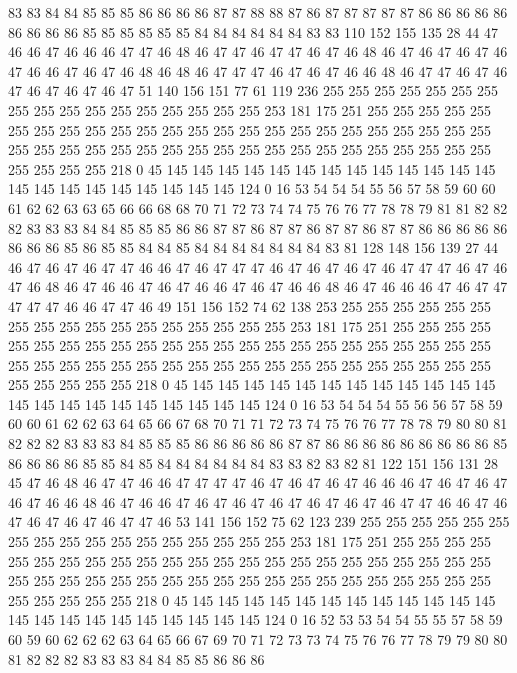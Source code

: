 83 83 84 84 85 85 85 86 86 86 86 87 87 88 88 87 86 87 87 87
87 87 86 86 86 86 86 86 86 86 86 85 85 85 85 85 85 84 84 84
84 84 84 83 83 110 152 155 135 28 44 47 46 46 47 46 46 46 47 47
46 48 46 47 47 46 47 47 46 47 46 48 46 47 46 47 46 47 46 47
46 46 47 46 47 46 48 46 48 46 47 47 47 46 47 46 47 46 46 48
46 47 47 46 47 46 47 46 47 46 47 46 47 51 140 156 151 77 61 119
236 255 255 255 255 255 255 255 255 255 255 255 255 255 255 255 255 255 253 181
175 251 255 255 255 255 255 255 255 255 255 255 255 255 255 255 255 255 255 255
255 255 255 255 255 255 255 255 255 255 255 255 255 255 255 255 255 255 255 255
255 255 255 255 255 255 255 255 255 218 0 45 145 145 145 145 145 145 145 145
145 145 145 145 145 145 145 145 145 145 145 145 145 145 124 0 16 53 54 54
54 55 56 57 58 59 60 60 61 62 62 63 63 65 66 66 68 68 70 71
72 73 74 74 75 76 76 77 78 78 79 81 81 82 82 82 83 83 83 84
84 85 85 85 86 86 87 87 86 87 87 86 87 87 86 87 87 86 86 86
86 86 86 86 86 85 86 85 85 84 84 85 84 84 84 84 84 84 84 83
81 128 148 156 139 27 44 46 47 46 47 46 47 47 46 46 47 46 47 47
47 46 47 46 47 46 47 46 47 47 47 46 47 46 47 46 48 46 47 46
46 47 46 47 46 46 47 46 47 46 46 48 46 47 46 46 46 47 46 47
47 47 47 47 46 46 47 47 46 49 151 156 152 74 62 138 253 255 255 255
255 255 255 255 255 255 255 255 255 255 255 255 255 255 253 181 175 251 255 255
255 255 255 255 255 255 255 255 255 255 255 255 255 255 255 255 255 255 255 255
255 255 255 255 255 255 255 255 255 255 255 255 255 255 255 255 255 255 255 255
255 255 255 255 255 218 0 45 145 145 145 145 145 145 145 145 145 145 145 145
145 145 145 145 145 145 145 145 145 145 124 0 16 53 54 54 54 55 56 56
57 58 59 60 60 61 62 62 63 64 65 66 67 68 70 71 71 72 73 74
75 76 76 77 78 78 79 80 80 81 82 82 82 83 83 83 84 85 85 85
86 86 86 86 86 87 87 86 86 86 86 86 86 86 86 86 85 86 86 86
86 85 85 84 85 84 84 84 84 84 84 83 83 82 83 82 81 122 151 156
131 28 45 47 46 48 46 47 47 46 46 47 47 47 47 46 47 46 47 46
47 46 46 46 47 46 47 46 47 46 47 46 46 48 46 47 46 46 47 46
47 46 47 46 47 46 47 46 47 46 47 47 46 46 47 46 47 46 47 46
47 46 47 47 46 53 141 156 152 75 62 123 239 255 255 255 255 255 255 255
255 255 255 255 255 255 255 255 255 255 253 181 175 251 255 255 255 255 255 255
255 255 255 255 255 255 255 255 255 255 255 255 255 255 255 255 255 255 255 255
255 255 255 255 255 255 255 255 255 255 255 255 255 255 255 255 255 255 255 255
255 218 0 45 145 145 145 145 145 145 145 145 145 145 145 145 145 145 145 145
145 145 145 145 145 145 124 0 16 52 53 53 54 54 55 55 57 58 59 60
59 60 62 62 62 63 64 65 66 67 69 70 71 72 73 73 74 75 76 76
77 78 79 79 80 80 81 82 82 82 83 83 83 84 84 85 85 86 86 86

